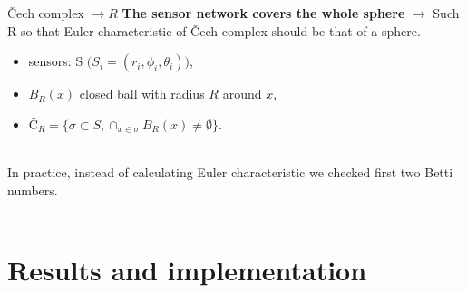 \documentclass{beamer}
\begin{document}
\begin{frame}{Čech complex $\longrightarrow R$}{}
\textbf{The sensor network covers the whole sphere} $\longrightarrow$ Such R so that Euler characteristic of Čech complex should be that of a sphere.
\begin{itemize}
	\item {sensors: S $\big(S_i = (r_i, \phi_i, \theta_i)\big)$,}
	\item {$B_R(x)$ closed ball with radius $R$ around $x$,}
	\item {$Č_R = \{\sigma \subset S,\cap_{x\in \sigma}B_R(x) \neq \emptyset \}$.\\~\
	}
\end{itemize}

In practice, instead of calculating Euler characteristic we checked first two Betti numbers.\\~\

\end{frame}

\section{Results and implementation}
\end{document}
